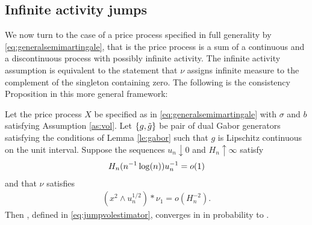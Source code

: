 \subsection{Infinite activity \levy jumps}
We now turn to the case of a price process specified in full generality by \eqref{eq:generalsemimartingale}, that is the price process is a sum of a continuous and a discontinuous process with possibly  infinite activity. The infinite activity assumption is equivalent to  the statement that $\nu$ assigns  infinite measure to the complement of the singleton containing zero.    The following is the consistency Proposition in this more general framework:
\begin{prop} \label{pro:infinity}
  Let the price process  $X$ be specified as in  \eqref{eq:generalsemimartingale} with $\sigma$ and $b$ satisfying Assumption \ref{as:vol}. Let $\{g, \tilde{g}\}$ be pair of dual Gabor generators satisfying the conditions of Lemma \eqref{le:gabor} such that $g$ is Lipschitz continuous on the unit interval.
  Suppose the sequences $u_n \downarrow 0$ and $H_n \uparrow \infty$ satisfy 
  \begin{align}
    H_n (n^{-1} \log(n)) u_n^{-1} = o(1)\notag
    \label{}
  \end{align} and   that $\nu$ satisfies 
  \begin{align}
    (x^2 \wedge u_n^{1/2}) \ast \nu_1 = o(H_n^{-2}).
    \label{eq:smallo}
  \end{align}
  Then  \jvn, defined in \eqref{eq:jumpvolestimator}, converges in \Ltwo in probability to \sv.
\end{prop}
